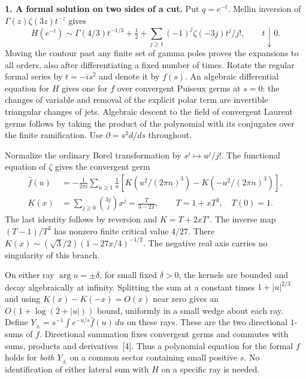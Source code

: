 \documentclass[11pt]{article}
\newcommand{\pp}{\partial}
\newcommand{\head}[1]{\par\medskip\noindent\textbf{#1}\quad}
\begin{document}
\head{1. A formal solution on two sides of a cut.}
Put $q=e^{-t}$. Mellin inversion of $\Gamma(z)\zeta(3z)t^{-z}$ gives
\[
 H(e^{-t})\sim\Gamma(4/3)t^{-1/3}+\tfrac12+
       \sum_{j\geq1}(-1)^j\zeta(-3j)t^j/j!,\qquad t\downarrow0.
\]
Moving the contour past any finite set of gamma poles proves the expansions to all orders, also after differentiating a fixed number of times. Rotate the regular formal series by $t=-is^2$ and denote it by $f(s)$. An algebraic differential equation for $H$ gives one for $f$ over convergent Puiseux germs at $s=0$: the changes of variable and removal of the explicit polar term are invertible triangular changes of jets. Algebraic descent to the field of convergent Laurent germs follows by taking the product of the polynomial with its conjugates over the finite ramification. Use $\pp=s^2d/ds$ throughout.

Normalize the ordinary Borel transformation by $s^j\mapsto u^j/j!$. The functional equation of $\zeta$ gives the convergent germ
\begin{align}
 \widehat f(u)&=-\frac1{2\pi i}\sum_{n\geq1}\frac1n
       [K(u^2/(2\pi n)^3)-K(-u^2/(2\pi n)^3)],\label{ker}\\
 K(x)&=\sum_{j\geq0}\binom{3j}{j}x^j
       =\frac{T}{3-2T},\qquad T=1+xT^3,\quad T(0)=1.\nonumber
\end{align}
The last identity follows by reversion and $K=T+2xT'$. The inverse map $(T-1)/T^3$ has nonzero finite critical value $4/27$. There $K(x)\sim(\sqrt3/2)(1-27x/4)^{-1/2}$. The negative real axis carries no singularity of this branch.

On either ray $\arg u=\pm\delta$, for small fixed $\delta>0$, the kernels are bounded and decay algebraically at infinity. Splitting the sum at a constant times $1+|u|^{2/3}$ and using $K(x)-K(-x)=O(x)$ near zero gives an $O(1+\log(2+|u|))$ bound, uniformly in a small wedge about each ray. Define $Y_\pm=s^{-1}\int e^{-u/s}\widehat f(u)\,du$ on these rays. These are the two directional $1$-sums of $f$. Directional summation fixes convergent germs and commutes with sums, products and derivatives~[4]. Thus a polynomial equation for the formal $f$ holds for \emph{both} $Y_\pm$ on a common sector containing small positive $s$. No identification of either lateral sum with $H$ on a specific ray is needed.
\end{document}
